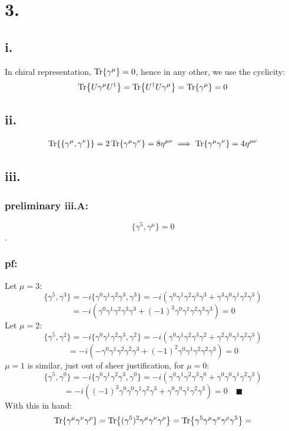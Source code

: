 \documentclass{article}
\begin{document}
\section*{3.}
\subsection*{i.}
In chiral representation, $\Tr{\gamma^\mu}=0$, hence in any other, we use the cyclicity:
\begin{equation}
    \Tr{U\gamma^\mu U^\dagger}=\Tr{U^\dagger U\gamma^\mu }=\Tr{\gamma^\mu}=0
\end{equation}
\subsection*{ii.}
\begin{equation}
    \begin{split}
        \Tr{ \left\{\gamma^\mu,\gamma^\nu\right\} }=2\Tr{\gamma^\mu\gamma^\nu}=8\eta^{\mu\nu} \implies \Tr{\gamma^\mu\gamma^\nu}=4\eta^{\mu\nu}
    \end{split}
\end{equation}

\subsection*{iii.}
\subsubsection*{preliminary iii.A:}$$\{\gamma^5, \gamma^\mu\}=0$$.
\subsubsection*{pf:}
Let $\mu=3$:
$$\{\gamma^5,\gamma^3\}=-i\{\gamma^0\gamma^1\gamma^2\gamma^3, \gamma^3\}=-i(\gamma^0\gamma^1\gamma^2\gamma^3\gamma^3 + \gamma^3\gamma^0\gamma^1\gamma^2\gamma^3)$$
$$=-i(\gamma^0\gamma^1\gamma^2\gamma^3\gamma^3+(-1)^3 \gamma^0\gamma^1\gamma^2\gamma^3\gamma^3)=0$$
Let $\mu=2$:
$$\{\gamma^5,\gamma^2\}=-i\{\gamma^0\gamma^1\gamma^2\gamma^3, \gamma^2\}=-i(\gamma^0\gamma^1\gamma^2\gamma^3\gamma^2 + \gamma^2\gamma^0\gamma^1\gamma^2\gamma^3)$$
$$=-i(-\gamma^0\gamma^1\gamma^2\gamma^2\gamma^3+(-1)^2 \gamma^0\gamma^1\gamma^2\gamma^2\gamma^3)=0$$
$\mu=1$ is similar, just out of sheer justification, for $\mu=0$:
$$\{\gamma^5,\gamma^0\}=-i\{\gamma^0\gamma^1\gamma^2\gamma^3, \gamma^0\}=-i(\gamma^0\gamma^1\gamma^2\gamma^3\gamma^0 + \gamma^0\gamma^0\gamma^1\gamma^2\gamma^3)$$
$$=-i((-1)^3\gamma^0\gamma^0\gamma^1\gamma^2\gamma^3+ \gamma^0\gamma^0\gamma^1\gamma^2\gamma^3)=0 \quad \blacksquare$$ 
With this in hand:
$$
\Tr{\gamma^\mu\gamma^\nu\gamma^\rho} = \Tr{(\gamma^5)^2\gamma^\mu\gamma^\nu\gamma^\rho} = \Tr{\gamma^5\gamma^\mu\gamma^\nu\gamma^\rho\gamma^5} = $$
\end{document}
